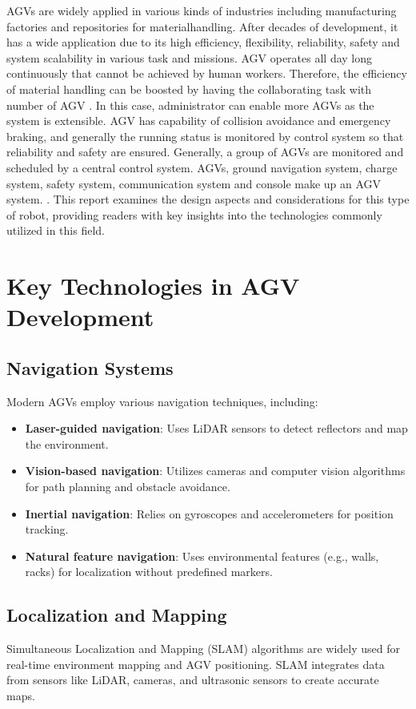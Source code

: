 \documentclass[main]{subfiles}
\begin{document}
AGVs are widely applied in various kinds
of industries including manufacturing
factories and repositories for materialhandling.
After decades of development, it
has a wide application due to its high
efficiency, flexibility, reliability, safety and
system scalability in various task and
missions.
AGV operates all day long continuously
that cannot be achieved by human workers.
Therefore, the efficiency of material
handling can be boosted by having the
collaborating task with number of AGV
. In this case, administrator can enable
more AGVs as the system is extensible.
AGV has capability of collision avoidance
and emergency braking, and generally the
running status is monitored by control
system so that reliability and safety are
ensured. Generally, a group of AGVs are
monitored and scheduled by a central
control system. AGVs, ground navigation
system, charge system, safety system,
communication system and console make
up an AGV system. \cite{shengfang2006research}. This report examines the design aspects and considerations for this type of robot, providing readers with key insights into the technologies commonly utilized in this field. 

\section{Key Technologies in AGV Development}

\subsection{Navigation Systems}
Modern AGVs employ various navigation techniques, including:
\begin{itemize}
    \item \textbf{Laser-guided navigation}: Uses LiDAR sensors to detect reflectors and map the environment.
    \item \textbf{Vision-based navigation}: Utilizes cameras and computer vision algorithms for path planning and obstacle avoidance.
    \item \textbf{Inertial navigation}: Relies on gyroscopes and accelerometers for position tracking.
    \item \textbf{Natural feature navigation}: Uses environmental features (e.g., walls, racks) for localization without predefined markers.
\end{itemize}

\subsection{Localization and Mapping}
Simultaneous Localization and Mapping (SLAM) algorithms are widely used for real-time environment mapping and AGV positioning. SLAM integrates data from sensors like LiDAR, cameras, and ultrasonic sensors to create accurate maps.
\end{document}
